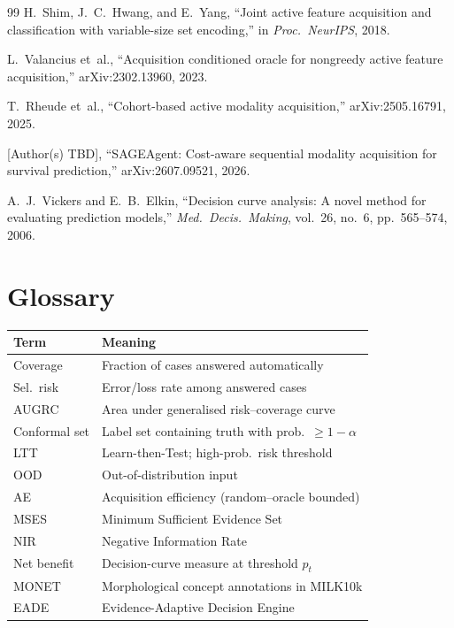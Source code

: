 \documentclass[conference]{IEEEtran}
\newcommand{\1}{\mathbf{1}}
\begin{document}
\begin{thebibliography}{99}
H.~Shim, J.~C.~Hwang, and E.~Yang,
``Joint active feature acquisition and classification with variable-size
set encoding,''
in \emph{Proc.\ NeurIPS}, 2018.

L.~Valancius et~al.,
``Acquisition conditioned oracle for nongreedy active feature acquisition,''
arXiv:2302.13960, 2023.

T.~Rheude et~al.,
``Cohort-based active modality acquisition,''
arXiv:2505.16791, 2025.

[Author(s) TBD],
``SAGEAgent: Cost-aware sequential modality acquisition for survival prediction,''
arXiv:2607.09521, 2026.

A.~J.~Vickers and E.~B.~Elkin,
``Decision curve analysis: A novel method for evaluating prediction models,''
\emph{Med.\ Decis.\ Making}, vol.~26, no.~6, pp.~565--574, 2006.

\end{thebibliography}

\appendix

\section{Glossary}
\label{app:glossary}

\begin{table}[H]
  \centering
  \renewcommand{\arraystretch}{1.2}
  \small
  \begin{tabular}{p{1.3cm}p{5.9cm}}
    \toprule
    \textbf{Term} & \textbf{Meaning} \\
    \midrule
    Coverage & Fraction of cases answered automatically \\
    Sel.\ risk & Error/loss rate among answered cases \\
    AUGRC & Area under generalised risk--coverage curve \\
    Conformal set & Label set containing truth with prob.\ $\geq 1-\alpha$ \\
    LTT & Learn-then-Test; high-prob.\ risk threshold \\
    OOD & Out-of-distribution input \\
    AE & Acquisition efficiency (random--oracle bounded) \\
    MSES & Minimum Sufficient Evidence Set \\
    NIR & Negative Information Rate \\
    Net benefit & Decision-curve measure at threshold $p_t$ \\
    MONET & Morphological concept annotations in MILK10k \\
    EADE & Evidence-Adaptive Decision Engine \\
    \bottomrule
  \end{tabular}
\end{table}
\end{document}

